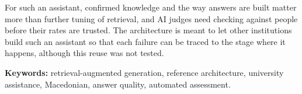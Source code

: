 For such an assistant, confirmed knowledge and the way answers are built matter more than further tuning of retrieval, and AI judges need checking against people before their rates are trusted. The architecture is meant to let other institutions build such an assistant so that each failure can be traced to the stage where it happens, although this reuse was not tested.

\noindent\textbf{Keywords:} retrieval-augmented generation, reference architecture, university assistance, Macedonian, answer quality, automated assessment.
